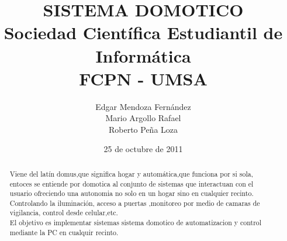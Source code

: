 \documentclass[letterpaper,12pt]{article}
\begin{document}
\date {25 de octubre de 2011}
\author {Edgar Mendoza Fernández \\ Mario Argollo Rafael \\ Roberto Peña Loza}
\title{SISTEMA DOMOTICO \\ Sociedad Cient\'ifica Estudiantil de Inform\'atica \\ FCPN - UMSA}
\maketitle
\begin{abstract}
Viene del latín domus,que significa hogar y automática,que funciona por si sola, 
entoces se entiende por domotica al conjunto de sistemas  que interactuan con el 
usuario ofreciendo una autonomia  no solo en un hogar sino en cualquier recinto.
Controlando la iluminación, acceso a puertas ,monitoreo por medio de camaras de 
vigilancia, control desde celular,etc.\\

El objetivo es implementar sistemas sistema domotico de automatizacion y control 
mediante la PC en cualquir recinto.
\end{abstract}
\end{document}
